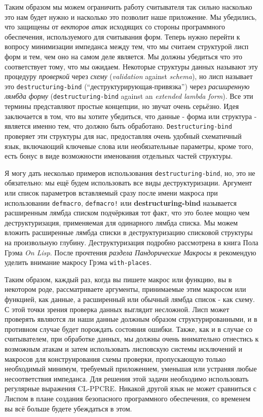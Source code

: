 Таким образом мы можем ограничить работу считывателя так сильно насколько это нам будет нужно и насколько это позволит наше приложение. Мы убедились, что защищены от \emph{векторов атак} исходящих со стороны программного обеспечения, используемого для считывания форм. Теперь нужно перейти к вопросу минимизации импеданса между тем, что мы считаем структурой лисп форм и тем, чем оно на самом деле является. Мы должны убедиться что это соответствует тому, что мы ожидаем. Некоторые структуры данных называют эту процедуру \emph{проверкой} через \emph{схему} (\emph{validation} against \emph{schema}), но лисп называет это \verb"destructuring-bind" (``деструктурирующая-привязка'') через \emph{расширенную лямбда форму} (\verb"destructuring-bind" against an \emph{extended lambda form}). Все эти термины представляют простые концепции, но звучат очень серьёзно. Идея заключается в том, что вы хотите убедиться, что данные - форма или структура - является именно тем, что должно быть обработано. \verb"Destructuring-bind" проверяет эти структуры для нас, предоставляя очень удобный схематичный язык, включающий ключевые слова или необязательные параметры, кроме того, есть бонус в виде возможности именования отдельных частей структуры.

Я могу дать несколько примеров использования \verb"destructuring-bind", но, это не обязательно: мы ещё будем использовать все виды деструктуризации. Аргумент или список параметров вставляемый сразу после имени макроса при использовании \verb"defmacro", \verb"defmacro!" или \textbf{de\-struc\-tu\-ring-bi\-nd} называется расширенным лямбда списком подчёркивая тот факт, что это более мощно чем деструктуризация, применяемая для одинарного лямбда списка. Мы можем вложить расширенные лямбда списки в деструктуризацию списковой структуры на произвольную глубину. Деструктуризация подробно рассмотрена в книга Пола Грэма \emph{On Lisp}. После прочтения \emph{раздела Пандорические Макросы} я рекомендую уделить внимание макросу Грэма \verb"with-places".

Таким образом, каждый раз, когда вы пишете макрос или функцию, вы в некотором роде, рассматриваете аргументы, принимаемые этим макросом или функцией, как данные, а расширенный или обычный лямбда список - как схему. С этой точки зрения проверка данных выглядит несложной. Лисп может проверять являются ли наши данные должным образом структурированными, и в противном случае будет порождать состояния ошибки. Также, как и в случае со считывателем, при обработке данных, мы должны очень внимательно отнестись к возможным атакам и затем использовать лисповскую системы исключений и макросов для конструирования схемы проверки, пропускающую только необходимый минимум, требуемый приложением, уменьшая или устраняя любые несоответствия импеданса. Для решения этой задачи необходимо использовать регулярные выражения CL-PPCRE. Никакой другой язык не может сравниться с Лиспом в плане создания безопасного программного обеспечения, со временем вы всё больше будете убеждаться в этом.
